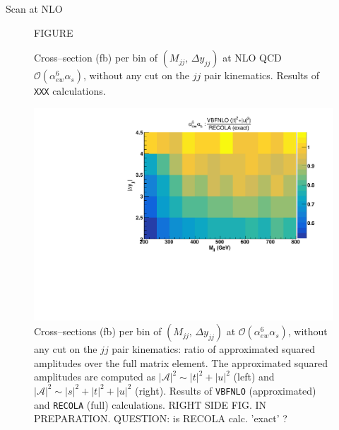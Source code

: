 Scan at NLO

\begin{figure}[hbt]
\centering
FIGURE
\caption{Cross--section (fb) per bin of $(M_{jj},\,\Delta y_{jj})$ at NLO QCD $\mathcal{O}(\alpha_{ew}^6\alpha_s)$, without any cut on the $jj$ pair kinematics. Results of \texttt{XXX} calculations.}\label{fig:mjjdyjj_2d_NLO}
\end{figure}


\begin{figure}[hbt]
\centering
\includegraphics[scale=0.395]{figures/scanfigures/a6as_vbfnloVSrecola_tu.pdf}
\caption{Cross--sections (fb) per bin of $(M_{jj},\,\Delta y_{jj})$ at $\mathcal{O}(\alpha_{ew}^6\alpha_s)$, without any cut on the $jj$ pair kinematics: ratio of approximated squared amplitudes over the full matrix element. The approximated squared amplitudes are computed as $|\mathcal{A}|^2 \sim |t|^2 + |u|^2$ (left) and $|\mathcal{A}|^2 \sim |s|^2 + |t|^2 + |u|^2$ (right). Results of \texttt{VBFNLO} (approximated) and \texttt{RECOLA} (full) calculations. RIGHT SIDE FIG. IN PREPARATION. QUESTION: is RECOLA calc. 'exact' ?}\label{fig:ratio2d_NLO}
\end{figure}